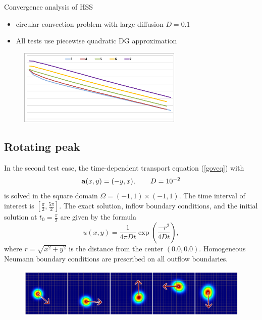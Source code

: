 \documentclass[mathserif]{beamer}
\begin{document}
\begin{frame}

{\large Convergence analysis of HSS}
\begin{itemize}
\item circular convection problem with large diffusion $D=0.1$
\item \vspace{-2mm}All tests use piecewise quadratic DG approximation
\end{itemize}
\begin{figure}
\centering
\includegraphics[width=0.7\textwidth]{resultGraphs/circularConvection/p2D1e-1_new.png}
\end{figure}
\end{frame}


\subsection{Rotating peak}
\begin{frame}
In the second test case, the time-dependent transport equation (\ref{goveq}) 
with
$$\mathbf{a}(x,y)=(-y,x),\qquad D=10^{-2}$$
is solved in the square domain $\Omega=(-1,1)\times(-1,1)$. The time interval
of interest is $\left[\frac{\pi}{2}, \frac{5\pi}{2}\right]$. The exact
solution, inflow boundary conditions, and the initial solution at
$t_0=\frac{\pi}{2}$ are given by the formula
\begin{equation}
u(x,y)=
\frac{1}{4\pi D t}\exp\left({\frac{-r^2}{4 D t}}\right),
\label{rotating-peak-data}
\end{equation}
where $r=\sqrt{x^2+y^2}$ is the distance from the center $(0.0,0.0)$. 
Homogeneous Neumann boundary conditions are
prescribed on all outflow boundaries. 
\begin{figure}[H]
\centering
	\includegraphics[width=.75\textwidth]{images/timedep.png}
\end{figure}

\end{frame}
\end{document}
